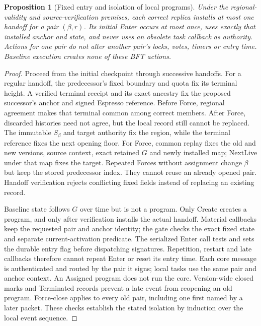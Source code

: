 \documentclass[11pt,a4paper]{article}
\newtheorem{proposition}[proposition]{Proposition}
\begin{document}
\begin{proposition}[Fixed entry and isolation of local programs]
\label{prop:program-isolation}
Under the regional-validity and source-verification premises, each
correct replica installs at most one handoff for a pair $(\beta,r)$.
Its initial Enter occurs at most once, uses exactly that installed
anchor and state, and never uses an obsolete task callback as authority.
Actions for one pair do not alter another pair's locks,
votes, timers or entry time. Baseline execution creates none of
these BFT actions.
\end{proposition}
\begin{proof}
Proceed from the initial checkpoint through successive handoffs.
For a regular handoff, the predecessor's fixed boundary and quota fix
its terminal height. A verified terminal receipt and its exact ancestry
fix the proposed successor's anchor and signed Espresso reference.
Before Force, regional agreement makes that terminal common among
correct members. After Force, discarded histories need not agree, but
the local record still cannot be replaced. The immutable $S_\beta$ and
target authority
fix the region, while the terminal reference fixes the next opening
floor. For Force, common replay fixes the old and new versions, source
context, exact retained $G$ and newly installed map; NextLive under that
map fixes the target. Repeated Forces without assignment
change $\beta$ but keep the stored predecessor index. They cannot
reuse an already opened pair. Handoff verification rejects conflicting
fixed fields instead of replacing an existing record.

Baseline state follows $G$ over time but is not a program. Only Create
creates a program, and only after verification installs the actual
handoff.
Material callbacks keep the requested pair and anchor identity;
the gate checks the exact fixed state and separate current-activation predicate.
The serialized Enter call tests and sets the durable entry flag
before dispatching signatures. Repetition, restart and late callbacks
therefore cannot repeat Enter or reset its entry time. Each core
message is authenticated and routed by the pair it signs; local tasks
use the same pair and anchor context. An Assigned program does not run
the core.
Version-wide closed marks and Terminated records prevent a late event
from reopening an old program. Force-close applies to every old pair,
including one first named by a later packet. These checks establish
the stated isolation by induction
over the local event sequence.
\end{proof}
\end{document}
